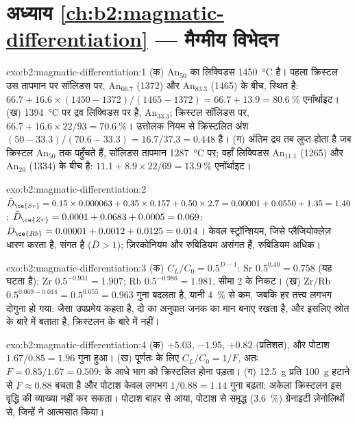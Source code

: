 \section*{अध्याय \ref{ch:b2:magmatic-differentiation} --- मैग्मीय विभेदन}

\begin{solution}{exo:b2:magmatic-differentiation:1}
(क) An$_{50}$ का लिक्विडस \qty{1450}{\celsius} है। पहला क्रिस्टल उस तापमान पर
सॉलिडस पर, An$_{66.7}$ (1372) और An$_{83.3}$ (1465) के बीच, स्थित है:
$66.7 + 16.6\times(1450 - 1372)/(1465 - 1372) = 66.7 + 13.9 = \qty{80.6}{\percent}$
एनॉर्थाइट। (ख) \qty{1394}{\celsius} पर द्रव लिक्विडस पर है,
An$_{33.3}$; क्रिस्टल सॉलिडस पर, $66.7 + 16.6\times22/93 =
\qty{70.6}{\percent}$। उत्तोलक नियम से क्रिस्टलित अंश $(50 -
33.3)/(70.6 - 33.3) = 16.7/37.3 = 0.448$ है। (ग) अंतिम द्रव तब लुप्त होता है जब
क्रिस्टल An$_{50}$ तक पहुँचते हैं, सॉलिडस तापमान \qty{1287}{\celsius} पर; वहाँ
लिक्विडस An$_{11.1}$ (1265) और An$_{20}$ (1334) के बीच है: $11.1 +
8.9\times22/69 = \qty{13.9}{\percent}$ एनॉर्थाइट।
\end{solution}

\begin{solution}{exo:b2:magmatic-differentiation:2}
$\bar D_{\ce{Sr}} = 0.15\times0.000063 + 0.35\times0.157 + 0.50\times2.7 = 0.00001 +
0.0550 + 1.35 = 1.40$; $\bar D_{\ce{Zr}} = 0.0001 + 0.0683 + 0.0005 = 0.069$;
$\bar D_{\ce{Rb}} = 0.00001 + 0.0012 + 0.0125 = 0.014$। केवल स्ट्रॉन्शियम, जिसे
प्लैजियोक्लेज़ धारण करता है, संगत है ($\bar D > 1$); ज़िरकोनियम और रुबिडियम असंगत हैं,
रुबिडियम अधिक।
\end{solution}

\begin{solution}{exo:b2:magmatic-differentiation:3}
(क) $C_L/C_0 = 0.5^{D-1}$: Sr $0.5^{0.40} = 0.758$ (यह घटता है); Zr $0.5^{-0.931} =
1.907$; Rb $0.5^{-0.986} = 1.981$, सीमा 2 के निकट। (ख) Zr/Rb
$0.5^{0.069 - 0.014} = 0.5^{0.055} = 0.963$ गुना बदलता है, यानी \qty{4}{\percent} से कम, जबकि हर
तत्त्व लगभग दोगुना हो गया: जैसा उपप्रमेय कहता है, दो  का अनुपात
जनक  का मान बनाए रखता है, और इसलिए स्रोत के बारे में बताता है,
क्रिस्टलन के बारे में नहीं।
\end{solution}

\begin{solution}{exo:b2:magmatic-differentiation:4}
(क)  $+5.03$,  $-1.95$,  $+0.82$ (प्रतिशत), और पोटाश
$1.67/0.85 = 1.96$ गुना हुआ। (ख) पूर्णतः  के लिए
$C_L/C_0 = 1/F$, अतः $F = 0.85/1.67 = 0.509$:  के आधे भाग को
क्रिस्टलित होना पड़ता। (ग) \qty{12.5}{g} प्रति \qty{100}{g} हटाने से $F \approx 0.88$ बचता है और
पोटाश केवल लगभग $1/0.88 = 1.14$ गुना बढ़ता: अकेला क्रिस्टलन इस वृद्धि की
व्याख्या नहीं कर सकता। पोटाश बाहर से आया, पोटाश से समृद्ध (\qty{3.6}{\percent})
ग्रेनाइटी ज़ेनोलिथों से, जिन्हें  ने आत्मसात किया।
\end{solution}

